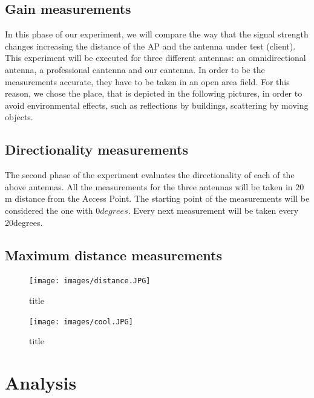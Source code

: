 \documentclass[12pt,a4paper]{article}
\begin{document}
\subsection{Gain measurements}
In this phase of our experiment, we will compare the way that the signal strength changes increasing the distance of the AP and the antenna under test (client). This experiment will be executed for three different antennas: an omnidirectional antenna, a professional cantenna and our cantenna. In order to be the measurements accurate, they have to be taken in an open area field. For this reason, we chose the place, that is depicted in the following pictures, in order to avoid environmental effects, such as reflections by buildings, scattering by moving objects.

\subsection{Directionality measurements}
The second phase of the experiment evaluates the directionality of each of the above antennas. All the measurements for the three antennas will be taken in $20$m distance from the Access Point. The starting point of the measurements will be considered the one with $0degrees$. Every next measurement will be taken every 20degrees.

\subsection{Maximum distance measurements}
\begin{figure}
	\texttt{[image: images/distance.JPG]}
	\caption{title}
	\label{distance}
\end{figure}

\begin{figure}
	\texttt{[image: images/cool.JPG]}
	\caption{title}
	\label{cool}
\end{figure}




\section{Analysis}


\end{document}
